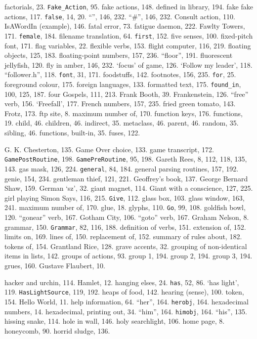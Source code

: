 factorials, 23.
{{\tt Fake\_Action}}, 95.
fake actions, 148.
\quad  defined in library, 194.
fake fake actions, 117.
{{\tt false}}, 14, 20.
``{\fam \ttfam \ninett *}'', 146, 232.
``{\fam \ttfam \ninett \#}'', 146, 232.
{\fam \ttfam \tentt Consult} action, 110.
{\fam \ttfam \tentt IsAWordIn} (example), 146.
fatal error, 73.
fatigue daemon, 222.
Fawlty Towers, 171.
{{\tt female}}, 184.
filename translation, 64.
{{\tt first}}, 152.
five senses, 100.
fixed-pitch font, 171.
flag variables, 22.
flexible verbs, 153.
flight computer, 116, 219.
floating objects, 125, 183.
floating-point numbers, 157, 236.
``floor'', 191.
fluorescent jellyfish, 120.
fly in amber, 146, 232.
`focus' of game, 126.
`Follow my leader', 118.
``follower.h'', 118.
{{\tt font}}, 31, 171.
foodstuffs, 142.
footnotes, 156, 235.
{{\tt for}}, 25.
foreground colour, 175.
foreign languages, 133.
formatted text, 175.
{{\tt found\_in}}, 100, 125, 187.
four Gospels, 111, 213.
Frank Booth, 39.
Frankenstein, 126.
``free'' verb, 156.
`Freefall', 177.
French numbers, 157, 235.
fried green tomato, 143.
Frotz, 173.
ftp site, 8.
\quad  maximum number of, 170.
function keys, 176.
functions, 19.
\quad  child, 46.
\quad  children, 46.
\quad  indirect, 35.
\quad  metaclass, 46.
\quad  parent, 46.
\quad  random, 35.
\quad  sibling, 46.
functions, built-in, 35.
fuses, 122.

G. K. Chesterton, 135.
Game Over choice, 133.
game transcript, 172.
{{\tt GamePostRoutine}}, 198.
{{\tt GamePreRoutine}}, 95, 198.
Gareth Rees, 8, 112, 118, 135, 143.
gas mask, 126, 224.
{{\tt general}}, 84, 184.
general parsing routines, 157, 192.
genie, 154, 234.
gentleman thief, 121, 221.
Geoffrey's book, 137.
George Bernard Shaw, 159.
German `sz', 32.
giant magnet, 114.
Giant with a conscience, 127, 225.
girl playing Simon Says, 116, 215.
{{\tt Give}}, 112.
glass box, 103.
glass window, 163, 241.
\quad  maximum number of, 170.
glue, 18.
glyphs, 110.
{{\tt Go}}, 99, 108.
goldfish bowl, 120.
``gonear'' verb, 167.
Gotham City, 106.
``goto'' verb, 167.
Graham Nelson, 8.
grammar, 150.
{{\tt Grammar}}, 82, 116, 188.
\quad  definition of verbs, 151.
\quad  extension of, 152.
\quad  limits on, 169.
\quad  lines of, 150.
\quad  replacement of, 152.
\quad  summary of rules about, 182.
\quad  tokens of, 154.
Grantland Rice, 128.
grave accents, 32.
grouping of non-identical items in lists, 142.
groups of actions, 93.
\quad  group 1, 194.
\quad  group 2, 194.
\quad  group 3, 194.
grues, 160.
Gustave Flaubert, 10.

hacker and urchin, 114.
Hamlet, 12.
hanging elses, 24.
{{\tt has}}, 52, 86.
`has light', 119.
{{\tt HasLightSource}}, 119, 192.
heaps of food, 142.
hearing (sense), 100.
 token, 154.
Hello World, 11.
help information, 64.
``her'', 164.
{{\tt herobj}}, 164.
hexadecimal numbers, 14.
hexadecimal, printing out, 34.
``him'', 164.
{{\tt himobj}}, 164.
``his'', 135.
hissing snake, 114.
hole in wall, 146.
holy searchlight, 106.
home page, 8.
honeycomb, 90.
horrid sludge, 136.

